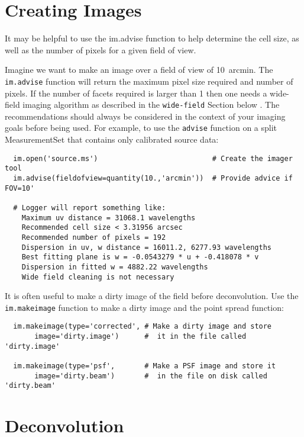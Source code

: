 \section{Creating Images}
\label{section:imtool.create}

It may be helpful to use the im.advise function to help determine the
cell size, as well as the number of pixels for a given field of view.

Imagine we want to make an image over a field of view of 10~arcmin.
The {\tt im.advise} function will return the maximum pixel size
required and number of pixels. If the number of facets required is
larger than 1 then one needs a wide-field imaging algorithm as
described in the {\tt wide-field} Section below . The recommendations
should always be considered in the context of your imaging goals
before being used.  For example, to use the {\tt advise} function on a
split MeasurementSet that contains only calibrated source data:

\small
\begin{verbatim}
  im.open('source.ms')                           # Create the imager tool
  im.advise(fieldofview=quantity(10.,'arcmin'))  # Provide advice if FOV=10'

  # Logger will report something like:
    Maximum uv distance = 31068.1 wavelengths
    Recommended cell size < 3.31956 arcsec
    Recommended number of pixels = 192
    Dispersion in uv, w distance = 16011.2, 6277.93 wavelengths
    Best fitting plane is w = -0.0543279 * u + -0.418078 * v
    Dispersion in fitted w = 4882.22 wavelengths
    Wide field cleaning is not necessary
\end{verbatim}
\normalsize

It is often useful to make a dirty image of the field before
deconvolution. Use the {\tt im.makeimage} function to make a dirty
image and the point spread function:


\small
\begin{verbatim}
  im.makeimage(type='corrected', # Make a dirty image and store
       image='dirty.image')      #  it in the file called 'dirty.image'

  im.makeimage(type='psf',       # Make a PSF image and store it
       image='dirty.beam')       #  in the file on disk called 'dirty.beam'
\end{verbatim}
\normalsize
 
\section{Deconvolution}
\label{section:imtool.decon}

